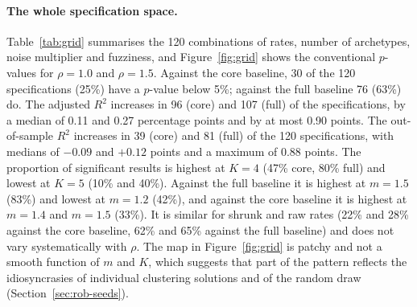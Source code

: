 \paragraph{The whole specification space.} Table~\ref{tab:grid} summarises the 120 combinations of rates, number of archetypes, noise multiplier and fuzziness, and Figure~\ref{fig:grid} shows the conventional $p$-values for $\rho=1.0$ and $\rho=1.5$. Against the core baseline, 30 of the 120 specifications (25\%) have a $p$-value below 5\%; against the full baseline 76 (63\%) do. The adjusted $R^2$ increases in 96 (core) and 107 (full) of the specifications, by a median of 0.11 and 0.27 percentage points and by at most 0.90 points. The out-of-sample $R^2$ increases in 39 (core) and 81 (full) of the 120 specifications, with medians of $-0.09$ and $+0.12$ points and a maximum of 0.88 points. The proportion of significant results is highest at $K=4$ (47\% core, 80\% full) and lowest at $K=5$ (10\% and 40\%). Against the full baseline it is highest at $m=1.5$ (83\%) and lowest at $m=1.2$ (42\%), and against the core baseline it is highest at $m=1.4$ and $m=1.5$ (33\%). It is similar for shrunk and raw rates (22\% and 28\% against the core baseline, 62\% and 65\% against the full baseline) and does not vary systematically with $\rho$. The map in Figure~\ref{fig:grid} is patchy and not a smooth function of $m$ and $K$, which suggests that part of the pattern reflects the idiosyncrasies of individual clustering solutions and of the random draw (Section~\ref{sec:rob-seeds}).

